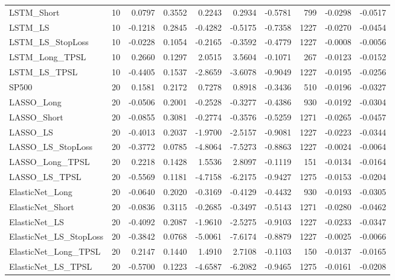 \begin{tabular}{llrrrrrrrr}
\cline{1-10}
LSTM\_Short & 10 & 0.0797 & 0.3552 & 0.2243 & 0.2934 & -0.5781 & 799 & -0.0298 & -0.0517 \\
\cline{1-10}
LSTM\_LS & 10 & -0.1218 & 0.2845 & -0.4282 & -0.5175 & -0.7358 & 1227 & -0.0270 & -0.0454 \\
\cline{1-10}
LSTM\_LS\_StopLoss & 10 & -0.0228 & 0.1054 & -0.2165 & -0.3592 & -0.4779 & 1227 & -0.0008 & -0.0056 \\
\cline{1-10}
LSTM\_Long\_TPSL & 10 & 0.2660 & 0.1297 & 2.0515 & 3.5604 & -0.1071 & 267 & -0.0123 & -0.0152 \\
\cline{1-10}
LSTM\_LS\_TPSL & 10 & -0.4405 & 0.1537 & -2.8659 & -3.6078 & -0.9049 & 1227 & -0.0195 & -0.0256 \\
\cline{1-10}
SP500 & 20 & 0.1581 & 0.2172 & 0.7278 & 0.8918 & -0.3436 & 510 & -0.0196 & -0.0327 \\
\cline{1-10}
LASSO\_Long & 20 & -0.0506 & 0.2001 & -0.2528 & -0.3277 & -0.4386 & 930 & -0.0192 & -0.0304 \\
\cline{1-10}
LASSO\_Short & 20 & -0.0855 & 0.3081 & -0.2774 & -0.3576 & -0.5259 & 1271 & -0.0265 & -0.0457 \\
\cline{1-10}
LASSO\_LS & 20 & -0.4013 & 0.2037 & -1.9700 & -2.5157 & -0.9081 & 1227 & -0.0223 & -0.0344 \\
\cline{1-10}
LASSO\_LS\_StopLoss & 20 & -0.3772 & 0.0785 & -4.8064 & -7.5273 & -0.8863 & 1227 & -0.0024 & -0.0064 \\
\cline{1-10}
LASSO\_Long\_TPSL & 20 & 0.2218 & 0.1428 & 1.5536 & 2.8097 & -0.1119 & 151 & -0.0134 & -0.0164 \\
\cline{1-10}
LASSO\_LS\_TPSL & 20 & -0.5569 & 0.1181 & -4.7158 & -6.2175 & -0.9427 & 1275 & -0.0153 & -0.0204 \\
\cline{1-10}
ElasticNet\_Long & 20 & -0.0640 & 0.2020 & -0.3169 & -0.4129 & -0.4432 & 930 & -0.0193 & -0.0305 \\
\cline{1-10}
ElasticNet\_Short & 20 & -0.0836 & 0.3115 & -0.2685 & -0.3497 & -0.5143 & 1271 & -0.0280 & -0.0462 \\
\cline{1-10}
ElasticNet\_LS & 20 & -0.4092 & 0.2087 & -1.9610 & -2.5275 & -0.9103 & 1227 & -0.0233 & -0.0347 \\
\cline{1-10}
ElasticNet\_LS\_StopLoss & 20 & -0.3842 & 0.0768 & -5.0061 & -7.6174 & -0.8879 & 1227 & -0.0025 & -0.0066 \\
\cline{1-10}
ElasticNet\_Long\_TPSL & 20 & 0.2147 & 0.1440 & 1.4910 & 2.7108 & -0.1103 & 150 & -0.0137 & -0.0165 \\
\cline{1-10}
ElasticNet\_LS\_TPSL & 20 & -0.5700 & 0.1223 & -4.6587 & -6.2082 & -0.9465 & 1275 & -0.0161 & -0.0208 \\

\end{tabular}

